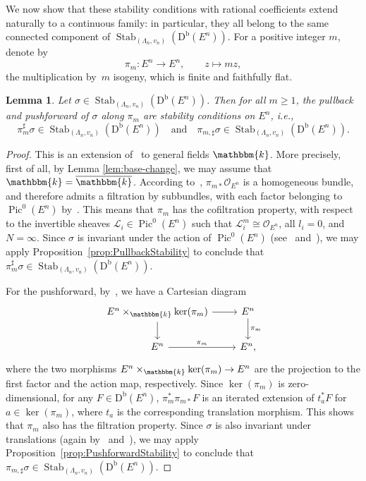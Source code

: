 \documentclass[11pt, reqno]{amsart}
\numberwithin{equation}{section}
\theoremstyle{plain}
\newtheorem{lemma}[theorem]{Lemma}
\theoremstyle{remark}
\theoremstyle{definition}
\theoremstyle{italicsname}
\newcommand{\Db}{\mathrm{D^b}}
\DeclareMathOperator{\Stab}{Stab}
\DeclareMathOperator{\Pic}{Pic}
\newcommand{\cO}{\mathcal{O}}
\newcommand{\cL}{\mathcal{L}}
\newcommand{\KK}{\mathbbm{k}}
\begin{document}
We now show that these stability conditions with rational coefficients extend naturally to a continuous family: in particular, they all belong to the same connected component of $\Stab_{(\Lambda_n,v_n)}(\Db(E^n))$. 
For a positive integer $m$, denote by
\[
\pi_m \colon E^n \longrightarrow E^n, \qquad z \longmapsto m z,
\]
the multiplication by~$m$ isogeny, which is finite and faithfully flat.

\begin{lemma}\label{lem:Multiplication}
Let $\sigma\in\Stab_{(\Lambda_n,v_n)}(\Db(E^n))$. 
Then for all $m\geq1$, the pullback and pushforward of $\sigma$ along $\pi_m$ are stability conditions on $E^n$, i.e., 
\[
\pi_m^\sharp\sigma\in\Stab_{(\Lambda_n,v_n)}(\Db(E^n)) \quad \text{and} \quad \pi_{m,\sharp}\sigma\in\Stab_{(\Lambda_n,v_n)}(\Db(E^n)).
\]
\end{lemma}

\begin{proof}
This is an extension of~\cite[Lemma 5.3]{chunyi-stability} to general fields $\KK$. 
More precisely, first of all, by Lemma \ref{lem:base-change}, we may assume that $\KK=\overline{\KK}$. 
According to~\cite[Lemma~4.20]{mukai:semihomogeneous}, $\pi_{m*}\cO_{E^n}$ is a homogeneous bundle, and therefore  admits a filtration by subbundles, with each factor belonging to $\Pic^0(E^n)$ by~\cite[Theorem 4.17]{mukai:semihomogeneous}. 
This means that $\pi_m$ has the cofiltration property, with respect to the invertible sheaves $\cL_i\in\Pic^0(E^n)$ such that $\cL_i^m\cong\cO_{E^n}$, all $l_i = 0$, and $N = \infty$.
Since $\sigma$ is invariant under the action of $\Pic^0(E^{n})$ (see~\cite[Theorem 3.5.1]{P-t-structures} and~\cite[Theorem 2.23]{curves}), we may apply Proposition~\ref{prop:PullbackStability} to conclude that $\pi_m^\sharp\sigma\in\Stab_{(\Lambda_n,v_n)}(\Db(E^n))$. 

For the pushforward, by~\cite[Example 2.68]{milne:alg-group}, we have a Cartesian diagram
\[
\begin{tikzcd}
	{E^n\times_{\KK} \ker(\pi_m)} & {E^n} \\
	{E^n} & {E^n,}
	\arrow[from=1-1, to=1-2]
	\arrow[from=1-1, to=2-1]
	\arrow["{\pi_m}", from=1-2, to=2-2]
	\arrow["{\pi_m}", from=2-1, to=2-2]
\end{tikzcd}
\]
where the two morphisms $E^n\times_{\KK} \ker(\pi_m)\to E^n$ are the projection to the first factor and the action map, respectively. 
Since $\ker(\pi_m)$ is zero-dimensional, for any $F\in \Db(E^n)$, $\pi_m^*\pi_{m*}F$ is an iterated extension of $t_a^*F$ for $a\in \ker(\pi_m)$, where $t_a$ is the corresponding translation morphism. 
This shows that $\pi_m$ also has the filtration property.
Since $\sigma$ is also invariant under translations (again by~\cite[Theorem 3.5.1]{P-t-structures} and~\cite[Theorem 2.23]{curves}), we may apply Proposition~\ref{prop:PushforwardStability} to conclude that $\pi_{m,\sharp}\sigma\in\Stab_{(\Lambda_n,v_n)}(\Db(E^n))$. 
\end{proof}
\end{document}

